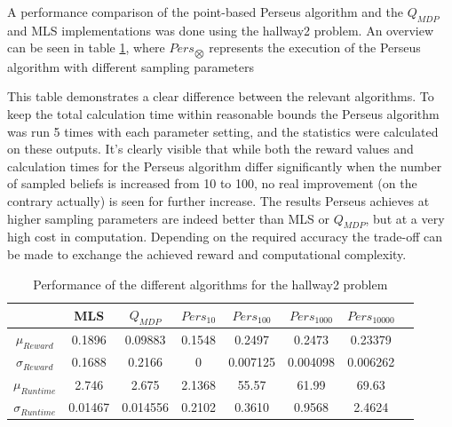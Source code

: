 \documentclass[10pt,a4paper]{article}
\begin{document}
A performance comparison of the point-based Perseus algorithm and the $Q_{MDP}$ and MLS implementations was done using the hallway2 problem.
An overview can be seen in table \ref{table:performance}, where $Pers_{\bigotimes}$ represents the execution of the Perseus algorithm with different sampling parameters

This table demonstrates a clear difference between the relevant algorithms.
To keep the total calculation time within reasonable bounds the Perseus algorithm was run 5 times with each parameter setting, and the statistics were calculated on these outputs.
It's clearly visible that while both the reward values and calculation times for the Perseus algorithm differ significantly when the number of sampled beliefs is increased from 10 to 100, no real improvement (on the contrary actually) is seen for further increase.
The results Perseus achieves at higher sampling parameters are indeed better than MLS or $Q_{MDP}$, but at a very high cost in computation.
Depending on the required accuracy the trade-off can be made to exchange the achieved reward and computational complexity.

\begin{table}
\centering
\begin{tabular}{ c || c | c | c | c | c | c | c}
\hfill & MLS & $Q_{MDP}$ & $Pers_{10}$ & $Pers_{100}$ & $Pers_{1000}$ & $Pers_{10000}$ \\
\hline
$\mu_{Reward}$ & 0.1896 & 0.09883 & 0.1548 & 0.2497 &  0.2473 & 0.23379\\
$\sigma_{Reward}$ & 0.1688 & 0.2166 & 0 & 0.007125 & 0.004098 & 0.006262 \\
\hline \hline
$\mu_{Runtime}$  & 2.746 & 2.675 & 2.1368 &  55.57 & 61.99 & 69.63 \\
$\sigma_{Runtime}$  & 0.01467 & 0.014556 & 0.2102 & 0.3610 & 0.9568 & 2.4624 \\
\end{tabular}
\caption{Performance of the different algorithms for the hallway2 problem}
\label{table:performance}
\end{table}
\end{document}
